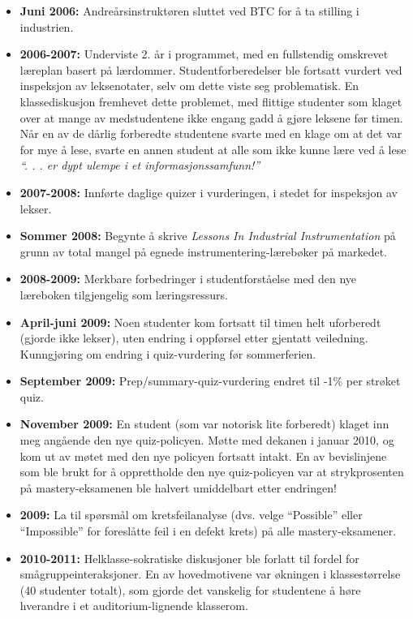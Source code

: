 \begin{itemize}
\vskip 10pt
\item{} {\bf Juni 2006:} Andreårsinstruktøren sluttet ved BTC for å ta stilling i industrien.
\vskip 10pt
\item{} {\bf 2006-2007:} Underviste 2. år i programmet, med en fullstendig omskrevet læreplan basert på lærdommer.  Studentforberedelser ble fortsatt vurdert ved inspeksjon av leksenotater, selv om dette viste seg problematisk.  En klassediskusjon fremhevet dette problemet, med flittige studenter som klaget over at mange av medstudentene ikke engang gadd å gjøre leksene før timen.  Når en av de dårlig forberedte studentene svarte med en klage om at det var for mye å lese, svarte en annen student at alle som ikke kunne lære ved å lese {\it ``. . . er dypt ulempe i et informasjonssamfunn!''}
\vskip 10pt
\item{} {\bf 2007-2008:} Innførte daglige quizer i vurderingen, i stedet for inspeksjon av lekser.
\vskip 10pt
\item{} {\bf Sommer 2008:} Begynte å skrive {\it Lessons In Industrial Instrumentation} på grunn av total mangel på egnede instrumentering-lærebøker på markedet.
\vskip 10pt
\item{} {\bf 2008-2009:} Merkbare forbedringer i studentforståelse med den nye læreboken tilgjengelig som læringsressurs.
\vskip 10pt
\item{} {\bf April-juni 2009:} Noen studenter kom fortsatt til timen helt uforberedt (gjorde ikke lekser), uten endring i oppførsel etter gjentatt veiledning.  Kunngjøring om endring i quiz-vurdering før sommerferien.
\vskip 10pt
\item{} {\bf September 2009:} Prep/summary-quiz-vurdering endret til -1\% per strøket quiz.
\vskip 10pt
\item{} {\bf November 2009:} En student (som var notorisk lite forberedt) klaget inn meg angående den nye quiz-policyen.  Møtte med dekanen i januar 2010, og kom ut av møtet med den nye policyen fortsatt intakt.  En av bevislinjene som ble brukt for å opprettholde den nye quiz-policyen var at strykprosenten på mastery-eksamenen ble halvert umiddelbart etter endringen!
\vskip 10pt
\item{} {\bf 2009:} La til spørsmål om kretsfeilanalyse (dvs. velge ``Possible'' eller ``Impossible'' for foreslåtte feil i en defekt krets) på alle mastery-eksamener.
\vskip 10pt
\item{} {\bf 2010-2011:} Helklasse-sokratiske diskusjoner ble forlatt til fordel for smågruppeinteraksjoner.  En av hovedmotivene var økningen i klassestørrelse (40 studenter totalt), som gjorde det vanskelig for studentene å høre hverandre i et auditorium-lignende klasserom.

\end{itemize}
